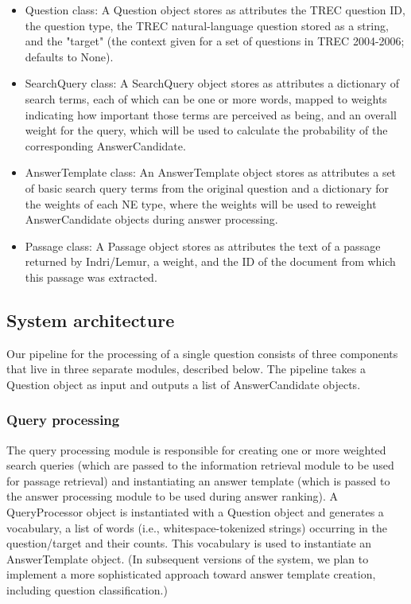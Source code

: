 \documentclass[11pt]{article}
\begin{document}
\begin{itemize}
\item Question class: A Question object stores as attributes the TREC question ID, the question type, the TREC natural-language question stored as a string, and the "target" (the context given for a set of questions in TREC 2004-2006; defaults to None).
\item SearchQuery class: A SearchQuery object stores as attributes a dictionary of search terms, each of which can be one or more words, mapped to weights indicating how important those terms are perceived as being, and an overall weight for the query, which will be used to calculate the probability of the corresponding AnswerCandidate.
\item AnswerTemplate class: An AnswerTemplate object stores as attributes a set of basic search query terms from the original question and a dictionary for the weights of each NE type, where the weights will be used to reweight AnswerCandidate objects during answer processing.
\item Passage class: A Passage object stores as attributes the text of a passage returned by Indri/Lemur, a weight, and the ID of the document from which this passage was extracted.
\end{itemize}

\subsection{System architecture}

Our pipeline for the processing of a single question consists of three components that live in three separate modules, described below. The pipeline takes a Question object as input and outputs a list of AnswerCandidate objects.

\subsubsection{Query processing}

The query processing module is responsible for creating one or more weighted search queries (which are passed to the information retrieval module to be used for passage retrieval) and instantiating an answer template (which is passed to the answer processing module to be used during answer ranking). A QueryProcessor object is instantiated with a Question object and generates a vocabulary, a list of words (i.e., whitespace-tokenized strings) occurring in the question/target and their counts. This vocabulary is used to instantiate an AnswerTemplate object. (In subsequent versions of the system, we plan to implement a more sophisticated approach toward answer template creation, including question classification.)
\end{document}
